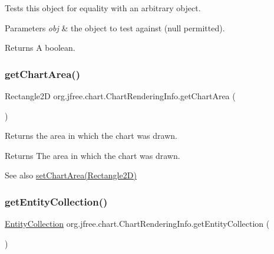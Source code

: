 Tests this object for equality with an arbitrary object.


\begin{DoxyParams}{Parameters}
{\em obj} & the object to test against ({\ttfamily null} permitted).\\
\hline
\end{DoxyParams}
\begin{DoxyReturn}{Returns}
A boolean. 
\end{DoxyReturn}
\mbox{\label{classorg_1_1jfree_1_1chart_1_1_chart_rendering_info_aa1fcdd48a4c2ab12d8bd808401185c9b}} 
\subsubsection{\texorpdfstring{get\+Chart\+Area()}{getChartArea()}}
{\footnotesize\ttfamily Rectangle2D org.\+jfree.\+chart.\+Chart\+Rendering\+Info.\+get\+Chart\+Area (\begin{DoxyParamCaption}{ }\end{DoxyParamCaption})}

Returns the area in which the chart was drawn.

\begin{DoxyReturn}{Returns}
The area in which the chart was drawn.
\end{DoxyReturn}
\begin{DoxySeeAlso}{See also}
\mbox{\hyperlink{classorg_1_1jfree_1_1chart_1_1_chart_rendering_info_abb45f3508efa2ad07500a048dd3eabe4}{set\+Chart\+Area(\+Rectangle2\+D)}} 
\end{DoxySeeAlso}
\mbox{\label{classorg_1_1jfree_1_1chart_1_1_chart_rendering_info_af353145dd9f3c18dba7e344f02303136}} 
\subsubsection{\texorpdfstring{get\+Entity\+Collection()}{getEntityCollection()}}
{\footnotesize\ttfamily \mbox{\hyperlink{interfaceorg_1_1jfree_1_1chart_1_1entity_1_1_entity_collection}{Entity\+Collection}} org.\+jfree.\+chart.\+Chart\+Rendering\+Info.\+get\+Entity\+Collection (\begin{DoxyParamCaption}{ }\end{DoxyParamCaption})}

